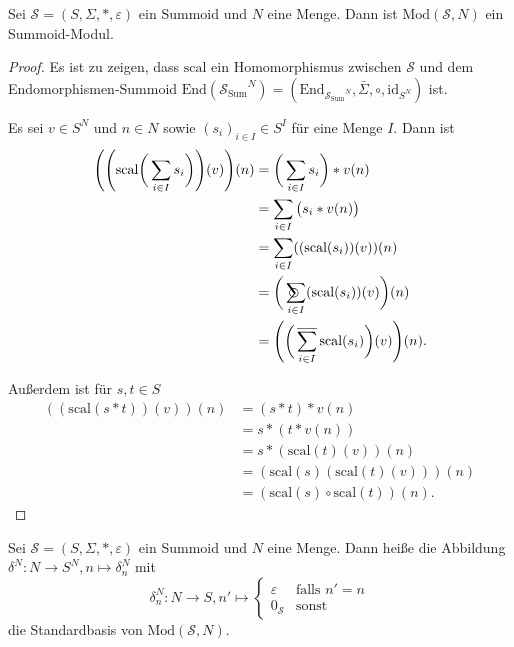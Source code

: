\documentclass{article}
\DeclareMathOperator*{\sumcirc}{%
  \ThisStyle{\mathop{\ensurestackMath{\stackinset{c}{-1.5\LMpt}{c}{}{%
  \rotatebox[origin=lb]{-90}{$\SavedStyle\scalerel*{\bm\Circle}{%
  i}$}}{\SavedStyle\sum}}}}}
\DeclareMathOperator*{\sumbar}{\overline{\sum}}
\begin{document}
\begin{theorem}
  Sei $\mathcal{S} = (S, \Sigma, \ast, \varepsilon)$ ein Summoid und $N$ eine Menge.
  Dann ist $\text{Mod}(\mathcal{S}, N)$ ein Summoid-Modul.
\end{theorem}
\begin{proof}
  Es ist zu zeigen, dass $\text{scal}$ ein Homomorphismus 
  zwischen $\mathcal{S}$ und dem Endomorphismen-Summoid $\text{End}({\mathcal{S}_\text{Sum}}^N) = (\text{End}_{{\mathcal{S}_\text{Sum}}^N}, \bar\Sigma, \circ, \text{id}_{S^N})$ ist.

  Es sei $v \in S^N$ und $n \in N$ sowie $(s_i)_{i \in I} \in S^I$ für eine Menge $I$. 
  Dann ist
  \begin{align*}
    \Bigg(\Bigg(\text{scal}\bigg(\sum_{i \in I}s_i\bigg)\Bigg)(v)\Bigg)(n) 
    &= \bigg(\sum_{i \in I} s_i \bigg) \ast v(n) \\
    &= \sum_{i \in I} \big(s_i \ast v(n)\big) \\
    &= \sum_{i \in I} ((\text{scal}(s_i))(v))(n) \\
    &= \bigg(\sumcirc_{i \in I} (\text{scal}(s_i))(v)\bigg)(n) \\
    &= \Bigg(\bigg(\sumbar_{i \in I}\text{scal}(s_i)\bigg)(v)\Bigg)(n).
  \end{align*}

  Außerdem ist für $s, t \in S$
  \begin{align*}
    ((\text{scal}(s \ast t))(v))(n)
    &= (s \ast t) \ast v(n) \\
    &= s \ast (t \ast v(n)) \\
    &= s \ast (\text{scal}(t)(v))(n) \\
    &= (\text{scal}(s)(\text{scal}(t)(v)))(n) \\
    &= (\text{scal}(s) \circ \text{scal}(t))(n).
  \end{align*}
\end{proof}

\begin{definition}
  Sei $\mathcal{S} = (S, \Sigma, \ast, \varepsilon)$ ein Summoid und $N$ eine Menge.
  Dann heiße die Abbildung $\delta^N \colon N \to S^N, n \mapsto \delta^N_n$ mit
  \begin{equation*}
    \delta^N_n \colon N \to S, n' \mapsto
    \begin{cases}
      \varepsilon & \text{falls } n' = n \\
      0_\mathcal{S} & \text{sonst}
    \end{cases}
  \end{equation*}
  die Standardbasis von $\text{Mod}(\mathcal{S}, N)$.
\end{definition}
\end{document}
